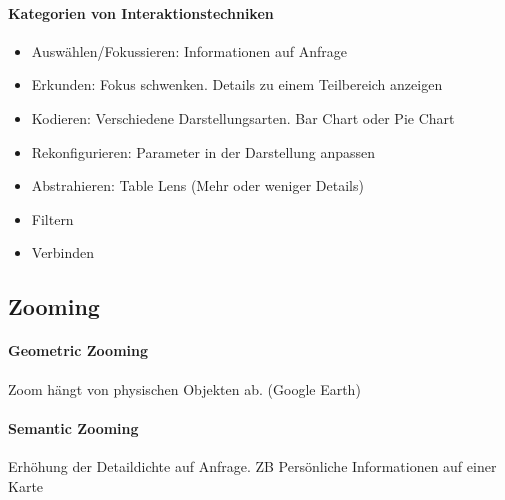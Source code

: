 \documentclass[ngerman]{scrartcl}
\begin{document}
\paragraph{Kategorien von Interaktionstechniken}
\begin{itemize}
	\item Auswählen/Fokussieren: Informationen auf Anfrage
	\item Erkunden: Fokus schwenken. Details zu einem Teilbereich anzeigen
	\item Kodieren: Verschiedene Darstellungsarten. Bar Chart oder Pie Chart
	\item Rekonfigurieren: Parameter in der Darstellung anpassen
	\item Abstrahieren: Table Lens (Mehr oder weniger Details)
	\item Filtern
	\item Verbinden
\end{itemize}

\subsection{Zooming}
\paragraph{Geometric Zooming} Zoom hängt von physischen Objekten ab. (Google Earth)

\paragraph{Semantic Zooming} Erhöhung der Detaildichte auf Anfrage. ZB Persönliche Informationen auf einer Karte
\end{document}
